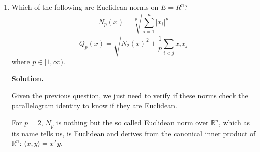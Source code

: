 \documentclass[12pt]{article}
\newcommand{\Z}{\mathbb{Z}}
\newcommand{\R}{\mathbb{R}}
\newcommand{\Q}{\mathbb{Q}}
\newcommand{\N}{\mathbb{N}}
\newenvironment{solution}{\vspace{0.2cm} \textbf{Solution.}}{}
\begin{document}
\begin{enumerate}[label=(\alph*)]
\begin{solution}
\begin{enumerate}[label={\roman*)}]
			By induction, we prove that this it is true for any power $n$ that:
			$$ \langle 2^n \cdot x, y \rangle = 2^n \cdot \langle x,y \rangle $$
			
			Taking $u = \frac{1}{2}(x+y)$ and $v = \frac{1}{2} (x-y)$, we have:
			$$ \langle x+y,z  \rangle = \langle 2 \cdot u,z \rangle = 2 \cdot \langle u, z\rangle = \langle u +v, z \rangle + \langle u-v, z \rangle = \langle x, z\rangle + \langle y,z \rangle$$.
			
			By induction we conclude that for any $n \in \N$ (we've seen that it's true for $n=0$), and any $x,y \in E$ we must have:
			$$\langle nx,y \rangle = n \langle x,y \rangle$$
			
			We can extend the linearity to $\Z$ using $\langle -x,y\rangle = - \langle x, y \rangle$, and then to $\Q$ using $\langle x,y \rangle = n \cdot \langle \frac{1}{n} x,y \rangle$.
			
			We conclude that the linearity is true over $\R$ using the well-known density of $\Q$ in $\R$ and the continuity of the application $(x,y) \mapsto \frac{1}{4} \cdot \left[ N(x+y)^2 - N(x-y)^2 \right]$, since the norm $N$ is continuous.
			
			Therefore, the linearity of $\langle \cdot, \cdot \rangle$ is true.
			
			Therefore $\langle \cdot, \cdot \rangle$ is an inner product over $E$ from which $N$ derives since $N(x) = \sqrt{\langle x,x \rangle}$.
			
			\underline{Conclusion:} $N$ is a Euclidean norm if and only if it checks the parallelogram identity.
			
		\end{enumerate}
		
		\end{solution}
		\item Which of the following are Euclidean norms on $E = R^n$?
		$$N_p (x) = \sqrt[p]{\sum_{i=1}^{n} |x_i|^p}$$
		$$Q_p (x) = \sqrt{N_2 (x)^2 + \frac{1}{p} \sum_{i < j} x_i x_j} $$
		where $p \in [1, \infty)$.
		
		\begin{solution}
		
		Given the previous question, we just need to verify if these norms check the parallelogram identity to know if they are Euclidean.
		
		For $p = 2$, $N_p$ is nothing but the so called Euclidean norm over $\R^n$, which as its name tells us, is Euclidean and derives from the canonical inner product of $\R^n$: $\langle x,y \rangle = x^T y$.
		

\end{solution}
\end{enumerate}
\end{document}
